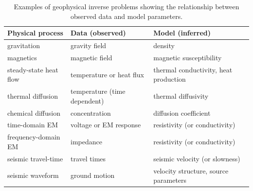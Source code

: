 \begin{table}[hbt]
    \centering
    \caption{Examples of geophysical inverse problems showing the relationship between observed data and model parameters.}
    \label{tab:invar}
    \begin{tabular}{@{}lll@{}}
        \toprule
        Physical process & Data (observed) & Model (inferred) \\
        \midrule
        gravitation & gravity field & density \\
        magnetics & magnetic field & magnetic susceptibility \\
        steady-state heat flow & temperature or heat flux & thermal conductivity, heat production \\
        thermal diffusion & temperature (time dependent) & thermal diffusivity \\
        chemical diffusion & concentration & diffusion coefficient \\
        time-domain EM & voltage or EM response & resistivity (or conductivity) \\
        frequency-domain EM & impedance & resistivity (or conductivity) \\
        seismic travel-time & travel times & seismic velocity (or slowness) \\
        seismic waveform & ground motion & velocity structure, source parameters \\
        \bottomrule
    \end{tabular}
\end{table}